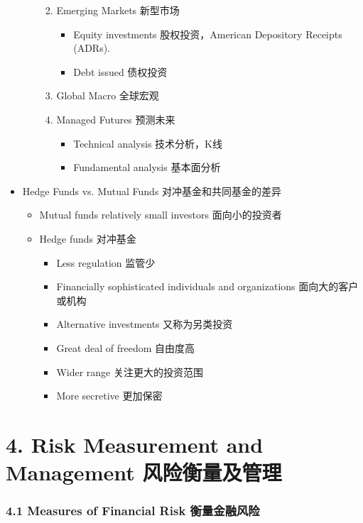\documentclass[a4paper,6pt,twoside,openany]{article}
\begin{document}
\begin{itemize}
\begin{itemize}
\begin{enumerate}
\begin{itemize}
      \end{itemize}
    \item Emerging Markets 新型市场
      \begin{itemize}
      \item Equity investments 股权投资，American Depository Receipts (ADRs).
      \item Debt issued 债权投资
      \end{itemize}
    \item Global Macro 全球宏观
    \item Managed Futures 预测未来
      \begin{itemize}
      \item Technical analysis 技术分析，K线
      \item Fundamental analysis 基本面分析
      \end{itemize}
    \end{enumerate}
  \end{itemize}
\item Hedge Funds vs. Mutual Funds 对冲基金和共同基金的差异
  \begin{itemize}
  \item Mutual funds relatively small investors 面向小的投资者
  \item Hedge funds 对冲基金
    \begin{itemize}
    \item Less regulation 监管少
    \item Financially sophisticated individuals and organizations 面向大的客户或机构
    \item Alternative investments 又称为另类投资
    \item Great deal of freedom 自由度高
    \item Wider range 关注更大的投资范围
    \item More secretive 更加保密
    \end{itemize}
  \end{itemize}
\end{itemize}


\newpage

\section*{4. Risk Measurement and Management 风险衡量及管理}
\subsubsection*{4.1 Measures of Financial Risk 衡量金融风险}
\end{document}
